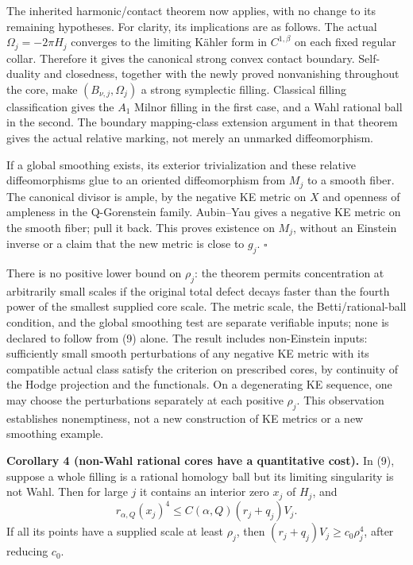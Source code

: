 \documentclass[
  11pt,
]{article}
\begin{document}
The inherited harmonic/contact theorem now applies, with no change to
its remaining hypotheses. For clarity, its implications are as follows.
The actual \(\Omega_j=-2\pi H_j\) converges to the limiting Kähler form
in \(C^{1,\beta}\) on each fixed regular collar. Therefore it gives the
canonical strong convex contact boundary. Self-duality and closedness,
together with the newly proved nonvanishing throughout the core, make
\((B_{\nu,j},\Omega_j)\) a strong symplectic filling. Classical filling
classification gives the \(A_1\) Milnor filling in the first case, and a
Wahl rational ball in the second. The boundary mapping-class extension
argument in that theorem gives the actual relative marking, not merely
an unmarked diffeomorphism.

If a global smoothing exists, its exterior trivialization and these
relative diffeomorphisms glue to an oriented diffeomorphism from \(M_j\)
to a smooth fiber. The canonical divisor is ample, by the negative KE
metric on \(X\) and openness of ampleness in the Q-Gorenstein family.
Aubin--Yau gives a negative KE metric on the smooth fiber; pull it back.
This proves existence on \(M_j\), without an Einstein inverse or a claim
that the new metric is close to \(g_j\). \(\square\)

There is no positive lower bound on \(\rho_j\): the theorem permits
concentration at arbitrarily small scales if the original total defect
decays faster than the fourth power of the smallest supplied core scale.
The metric scale, the Betti/rational-ball condition, and the global
smoothing test are separate verifiable inputs; none is declared to
follow from (9) alone. The result includes non-Einstein inputs:
sufficiently small smooth perturbations of any negative KE metric with
its compatible actual class satisfy the criterion on prescribed cores,
by continuity of the Hodge projection and the functionals. On a
degenerating KE sequence, one may choose the perturbations separately at
each positive \(\rho_j\). This observation establishes nonemptiness, not
a new construction of KE metrics or a new smoothing example.

\textbf{Corollary 4 (non-Wahl rational cores have a quantitative cost).}
In (9), suppose a whole filling is a rational homology ball but its
limiting singularity is not Wahl. Then for large \(j\) it contains an
interior zero \(x_j\) of \(H_j\), and \[
               r_{\alpha,Q}(x_j)^4
                    \le C(\alpha,Q)(r_j+q_j)V_j.         \tag{11}
\] If all its points have a supplied scale at least \(\rho_j\), then
\((r_j+q_j)V_j\ge c_0\rho_j^4\), after reducing \(c_0\).
\end{document}
